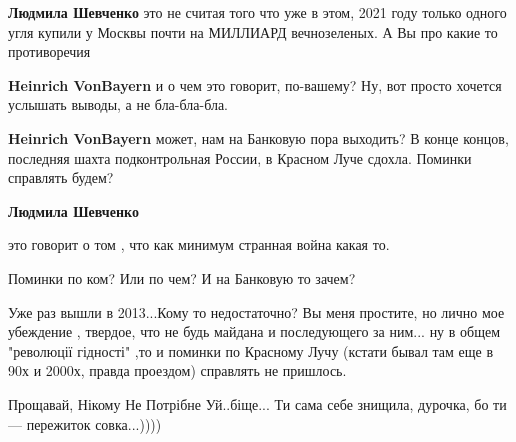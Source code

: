 \begin{itemize}
\begin{itemize}
\textbf{Людмила Шевченко} это не считая того что уже в этом, 2021 году только
одного угля купили у Москвы почти на МИЛЛИАРД вечнозеленых. А Вы про какие то
противоречия

 
\textbf{Heinrich VonBayern} и о чем это говорит, по-вашему? Ну, вот просто хочется услышать выводы, а не бла-бла-бла.

 
\textbf{Heinrich VonBayern} может, нам на Банковую пора выходить? В конце
концов, последняя шахта подконтрольная России, в Красном Луче сдохла. Поминки
справлять будем?

 
\textbf{Людмила Шевченко} 

это говорит о том , что как минимум странная война какая то.

Поминки по ком? Или по чем? И на Банковую то зачем?

Уже раз вышли в 2013...Кому то недостаточно? Вы меня простите, но лично мое
убеждение , твердое, что не будь майдана и последующего за ним... ну в общем
"революції гідності" ,то и поминки по Красному Лучу (кстати бывал там еще в 90х
и 2000х, правда проездом) справлять не пришлось.

\end{itemize}


Прощавай, Нікому Не Потрібне Уй..біще... Ти сама себе знищила, дурочка, бо ти —
пережиток совка...))))

\begin{itemize}
 

\end{itemize}
\end{itemize}
